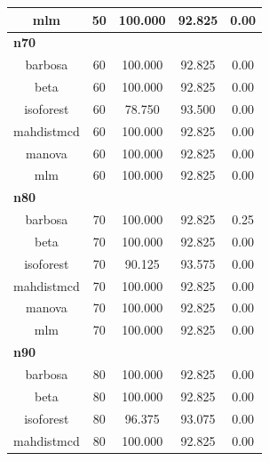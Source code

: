 \documentclass[
]{article}
\begin{document}
\begin{table}
\begin{tabular}[t]{c|c|c|c|c}
\hline
\hspace{1em}mlm & 50 & 100.000 & 92.825 & 0.00\\
\hline
\multicolumn{5}{l}{\textbf{n70}}\\
\hline
\hspace{1em}barbosa & 60 & 100.000 & 92.825 & 0.00\\
\hline
\hspace{1em}beta & 60 & 100.000 & 92.825 & 0.00\\
\hline
\hspace{1em}isoforest & 60 & 78.750 & 93.500 & 0.00\\
\hline
\hspace{1em}mahdistmcd & 60 & 100.000 & 92.825 & 0.00\\
\hline
\hspace{1em}manova & 60 & 100.000 & 92.825 & 0.00\\
\hline
\hspace{1em}mlm & 60 & 100.000 & 92.825 & 0.00\\
\hline
\multicolumn{5}{l}{\textbf{n80}}\\
\hline
\hspace{1em}barbosa & 70 & 100.000 & 92.825 & 0.25\\
\hline
\hspace{1em}beta & 70 & 100.000 & 92.825 & 0.00\\
\hline
\hspace{1em}isoforest & 70 & 90.125 & 93.575 & 0.00\\
\hline
\hspace{1em}mahdistmcd & 70 & 100.000 & 92.825 & 0.00\\
\hline
\hspace{1em}manova & 70 & 100.000 & 92.825 & 0.00\\
\hline
\hspace{1em}mlm & 70 & 100.000 & 92.825 & 0.00\\
\hline
\multicolumn{5}{l}{\textbf{n90}}\\
\hline
\hspace{1em}barbosa & 80 & 100.000 & 92.825 & 0.00\\
\hline
\hspace{1em}beta & 80 & 100.000 & 92.825 & 0.00\\
\hline
\hspace{1em}isoforest & 80 & 96.375 & 93.075 & 0.00\\
\hline
\hspace{1em}mahdistmcd & 80 & 100.000 & 92.825 & 0.00\\

\end{tabular}
\end{table}
\end{document}
